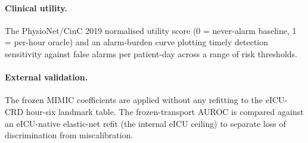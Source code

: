 \paragraph{Clinical utility.} The PhysioNet/CinC 2019 normalised utility
score (0 = never-alarm baseline, 1 = per-hour oracle) and an alarm-burden
curve plotting timely detection sensitivity against false alarms per
patient-day across a range of risk thresholds.

\paragraph{External validation.} The frozen MIMIC coefficients are applied
without any refitting to the eICU-CRD hour-six landmark table. The
frozen-transport AUROC is compared against an eICU-native elastic-net refit
(the internal eICU ceiling) to separate loss of discrimination from
miscalibration.
